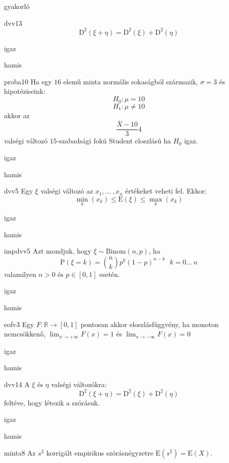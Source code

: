 \documentclass[12pt]{article}
\begin{document}
\begin{quiz}{gyakorló}
\begin{multi}[feedback={Páronként független valségi változókra a szórásnégyzet additív.}]{dvv13}
$$
\mathrm{D}^2(\xi+\eta)=\mathrm{D}^2(\xi)+\mathrm{D}^2(\eta)
$$
\item* igaz
\item hamis
\end{multi}
\begin{multi}[feedback={A feltételek mellett a fenti mennyiség sztenderd normális, ha $H_0$ igaz.}]{proba10}
Ha egy $16$ elemű minta normális sokaságból származik, $\sigma=3$ és hipotéziseink:
$$
H_0: \mu=10
$$
$$
H_1: \mu\neq 10
$$
akkor az 
$$
\frac{\overline{X}-10}{3}4
$$
valségi változó $15$-szabadsági fokú Student eloszlású ha $H_0$ igaz.
\item igaz
\item* hamis
\end{multi}
\begin{multi}[feedback={Az adott feltételek mellet a várható érték egy súlyozott közép.}]{dvv5}
Egy $\xi$ valségi változó az $x_1,{...\:}, x_n$ értékeket veheti fel. Ekkor:
$$
\min_k(x_k)\le \mathrm{E}(\xi) \le \max_k(x_k)
$$
\item* igaz
\item hamis
\end{multi}
\begin{multi}[feedback={Def.}]{impdvv5}
Azt mondjuk, hogy $\xi\sim \mathrm{Binom}(n,p)$, ha 
$$
\mathrm{P}(\xi=k)=\binom{n}{k}p^k(1-p)^{n-k}\ \ \ k=0{...\:} n
$$
valamilyen $n>0$ és $p\in[0,1]$ esetén.
\item* igaz
\item hamis
\end{multi}
\begin{multi}[feedback={A balról folytonosság kell.}]{eofv3}
Egy $F:\mathbb{R}\to [0,1]$ pontosan akkor eloszlásfüggvény, ha monoton nemcsökkenő, 
$\lim_{x\to+\infty}F(x)=1$ és $\lim_{x\to-\infty}F(x)=0$
\item igaz
\item* hamis
\end{multi}
\begin{multi}[feedback={Páronként független valségi változókra a szórásnégyzet additív, általában nem.}]{dvv14}
A $\xi$ és $\eta$ valségi változókra:
$$
\mathrm{D}^2(\xi+\eta)=\mathrm{D}^2(\xi)+\mathrm{D}^2(\eta)
$$
feltéve, hogy létezik a szórásuk.
\item igaz
\item* hamis
\end{multi}
\begin{multi}[feedback={Az $s^2$ torzítatlan becslése a sokasági (elméleti) szórásnégyzetnek}]{minta8}
Az $s^2$ korrigált empirikus szórásnégyzetre $\mathrm{E}(s^2)=\mathrm{E}(X)$.

\end{multi}
\end{quiz}
\end{document}
